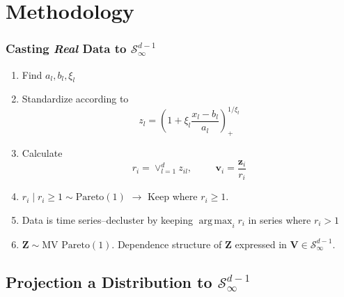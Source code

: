 \documentclass[aspectratio=169]{beamer}
\DeclareMathOperator*{\argmax}{arg\,max}
\begin{document}
\section{Methodology}

\begin{frame}
  \frametitle{Casting \emph{Real} Data to $\mathcal{S}_{\infty}^{d-1}$}
  \begin{enumerate}
      \item Find $a_l, b_l, \xi_l$
      \item Standardize according to
        \begin{equation*}
         z_l = \left(1 + \xi_l\frac{x_l - b_{l}}{a_{l}}\right)_{+}^{1/\xi_l}
        \end{equation*}
      \item Calculate
        \begin{equation*}
            r_i = \vee_{l=1}^d z_{il},\hspace{1cm}\bm{v}_i = \frac{\bm{z}_i}{r_i}
        \end{equation*}
        
      \item $r_i\mid r_i \geq 1 \sim \text{Pareto}(1)$ $\rightarrow$ Keep where $r_i \geq 1$.
      \item Data is time series--decluster by keeping $\argmax_i r_i$ in series where $r_i > 1$
      \item $\bm{Z} \sim \text{MV Pareto}(1)$.  Dependence structure of $\bm{Z}$ expressed in $\bm{V}\in\mathcal{S}_{\infty}^{d-1}$.
  \end{enumerate}
\end{frame}

\subsection{Projection a Distribution to $\mathcal{S}_{\infty}^{d-1}$}
\end{document}
